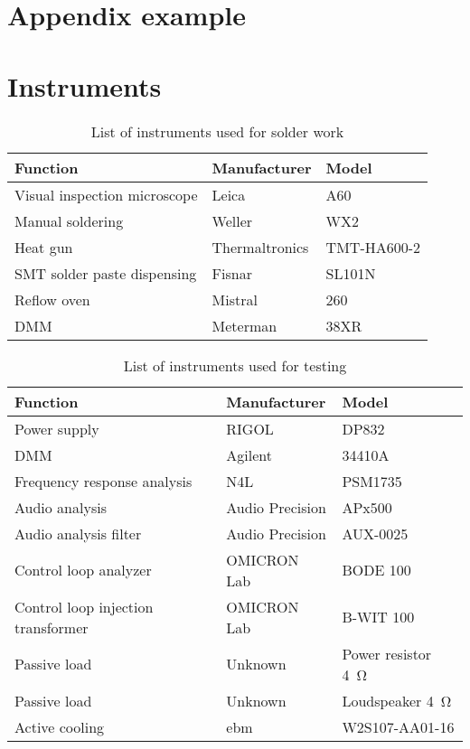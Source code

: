 \chapter{Appendix example}

\chapter{Instruments}
\begin{table}[ht]
	\centering
	\begin{tabular}{@{}lll@{}}
		\toprule
		\textbf{Function} & \textbf{Manufacturer} & \textbf{Model} \\ \midrule
		Visual inspection microscope & Leica & A60 \\
		Manual soldering & Weller & WX2 \\
		Heat gun & Thermaltronics & TMT-HA600-2 \\
		SMT solder paste dispensing & Fisnar & SL101N \\
		Reflow oven & Mistral & 260 \\
		DMM & Meterman & 38XR \\ \bottomrule
	\end{tabular}
	\caption{List of instruments used for solder work}
	\label{tab:instruments_solder_work}
\end{table}

\begin{table}[ht]
	\centering
	\begin{tabular}{@{}lll@{}}
		\toprule
		\textbf{Function} & \textbf{Manufacturer} & \textbf{Model} \\ \midrule
		Power supply & RIGOL & DP832 \\
		DMM & Agilent & 34410A \\
		Frequency response analysis & N4L & PSM1735 \\
		Audio analysis & Audio Precision & APx500 \\
		Audio analysis filter & Audio Precision & AUX-0025 \\
		Control loop analyzer & OMICRON Lab & BODE 100 \\
		Control loop injection transformer & OMICRON Lab & B-WIT 100 \\
		Passive load & Unknown & Power resistor \SI{4}{\ohm} \\
		Passive load & Unknown & Loudspeaker \SI{4}{\ohm} \\
		Active cooling & ebm & W2S107-AA01-16 \\ \bottomrule
	\end{tabular}
	\caption{List of instruments used for testing}
	\label{tab:instruments_hardware}
\end{table}
